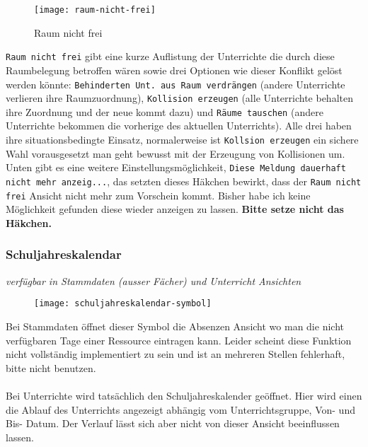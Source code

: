 \begin{wrapfigure}{r}{0.3\textwidth}
	\vspace{-14pt}
	\texttt{[image: raum-nicht-frei]}
	\vspace{-15pt}
	\caption{Raum nicht frei}
	\label{fig:raum-nicht-frei}
	\vspace{10pt}
\end{wrapfigure}

\noindent
\texttt{Raum nicht frei} gibt eine kurze Auflistung der Unterrichte die durch diese Raumbelegung betroffen wären sowie drei Optionen wie dieser Konflikt gelöst werden könnte: \texttt{Behinderten Unt. aus Raum verdrängen} (andere Unterrichte verlieren ihre Raumzuordnung), \texttt{Kollision erzeugen} (alle Unterrichte behalten ihre Zuordnung und der neue kommt dazu) und \texttt{Räume tauschen} (andere Unterrichte bekommen die vorherige des aktuellen Unterrichts). Alle drei haben ihre situationsbedingte Einsatz, normalerweise ist \texttt{Kollsion erzeugen} ein sichere Wahl vorausgesetzt man geht bewusst mit der Erzeugung von Kollisionen um. Unten gibt es eine weitere Einstellungsmöglichkeit, \texttt{Diese Meldung dauerhaft nicht mehr anzeig...}, das setzten dieses Häkchen bewirkt, dass der \texttt{Raum nicht frei} Ansicht nicht mehr zum Vorschein kommt. Bisher habe ich keine Möglichkeit gefunden diese wieder anzeigen zu lassen. \textbf{Bitte setze nicht das Häkchen.}

\newpage

\subsubsection{Schuljahreskalendar}
{\small\textit{verfügbar in Stammdaten (ausser Fächer) und Unterricht Ansichten\\}\par}

\begin{wrapfigure}{r}{.05\textwidth}
	\vspace{-50pt}
	\texttt{[image: schuljahreskalendar-symbol]}
	\vspace{-35pt}
\end{wrapfigure}

\noindent
Bei Stammdaten öffnet dieser Symbol die Absenzen Ansicht wo man die nicht verfügbaren Tage einer Ressource eintragen kann. Leider scheint diese Funktion nicht vollständig implementiert zu sein und ist an mehreren Stellen fehlerhaft, bitte nicht benutzen.\\
\\
Bei Unterrichte wird tatsächlich den Schuljahreskalender geöffnet. Hier wird einen die Ablauf des Unterrichts angezeigt abhängig vom Unterrichtsgruppe, Von- und Bis- Datum. Der Verlauf lässt sich aber nicht von dieser Ansicht beeinflussen lassen.\\

